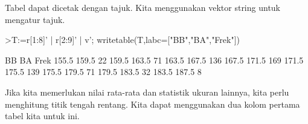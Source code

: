 \documentclass[a4paper,10pt]{article}
\begin{document}
\begin{eulernotebook}
\begin{eulercomment}
\begin{eulercomment}
\begin{eulercomment}
\begin{eulercomment}
\begin{eulercomment}
\begin{eulercomment}
\begin{eulercomment}
\begin{eulercomment}
\begin{eulercomment}
\begin{eulercomment}
\begin{eulercomment}
\begin{eulercomment}
\begin{eulercomment}
\begin{eulercomment}
\begin{eulercomment}
\begin{eulercomment}
\begin{eulercomment}
\begin{eulercomment}
\begin{eulercomment}
\begin{eulercomment}
\begin{eulercomment}
\begin{eulercomment}
\begin{eulercomment}
\begin{eulercomment}
\begin{eulercomment}
\begin{eulercomment}
\begin{eulercomment}
\begin{eulercomment}
\begin{eulercomment}
\begin{eulercomment}
\begin{eulercomment}
\begin{eulercomment}
\begin{eulercomment}
Tabel dapat dicetak dengan tajuk. Kita menggunakan vektor string untuk
mengatur tajuk.
\end{eulercomment}
\begin{eulerprompt}
>T:=r[1:8]' | r[2:9]' | v'; writetable(T,labc=["BB","BA","Frek"])
\end{eulerprompt}
\begin{euleroutput}
          BB        BA      Frek
       155.5     159.5        22
       159.5     163.5        71
       163.5     167.5       136
       167.5     171.5       169
       171.5     175.5       139
       175.5     179.5        71
       179.5     183.5        32
       183.5     187.5         8
\end{euleroutput}
\begin{eulercomment}
Jika kita memerlukan nilai rata-rata dan statistik ukuran lainnya,
kita perlu menghitung titik tengah rentang. Kita dapat menggunakan dua
kolom pertama tabel kita untuk ini.


\end{eulercomment}
\end{eulercomment}
\end{eulercomment}
\end{eulercomment}
\end{eulercomment}
\end{eulercomment}
\end{eulercomment}
\end{eulercomment}
\end{eulercomment}
\end{eulercomment}
\end{eulercomment}
\end{eulercomment}
\end{eulercomment}
\end{eulercomment}
\end{eulercomment}
\end{eulercomment}
\end{eulercomment}
\end{eulercomment}
\end{eulercomment}
\end{eulercomment}
\end{eulercomment}
\end{eulercomment}
\end{eulercomment}
\end{eulercomment}
\end{eulercomment}
\end{eulercomment}
\end{eulercomment}
\end{eulercomment}
\end{eulercomment}
\end{eulercomment}
\end{eulercomment}
\end{eulercomment}
\end{eulercomment}
\end{eulernotebook}
\end{document}
